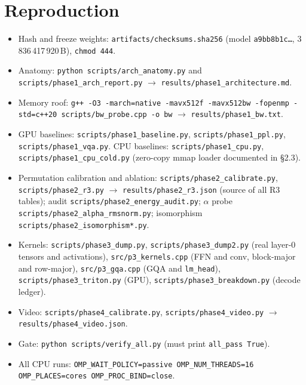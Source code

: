 \documentclass[11pt]{article}
\newcommand{\code}[1]{\texttt{\small #1}}
\begin{document}
\section{Reproduction}
\begin{sloppypar}
\begin{itemize}\raggedright
\item Hash and freeze weights: \code{artifacts/checksums.sha256} (model
\code{a9bb8b1c\ldots}, 3\,836\,417\,920\,B), \code{chmod 444}.
\item Anatomy: \code{python scripts/arch\_anatomy.py} and \code{scripts/phase1\_arch\_report.py}
$\rightarrow$ \code{results/phase1\_architecture.md}.
\item Memory roof: \code{g++ -O3 -march=native -mavx512f -mavx512bw -fopenmp -std=c++20
scripts/bw\_probe.cpp -o bw} $\rightarrow$ \code{results/phase1\_bw.txt}.
\item GPU baselines: \code{scripts/phase1\_baseline.py}, \code{scripts/phase1\_ppl.py},
\code{scripts/phase1\_vqa.py}. CPU baselines: \code{scripts/phase1\_cpu.py},
\code{scripts/phase1\_cpu\_cold.py} (zero-copy mmap loader documented in \S2.3).
\item Permutation calibration and ablation: \code{scripts/phase2\_calibrate.py},
\code{scripts/phase2\_r3.py} $\rightarrow$ \code{results/phase2\_r3.json} (source of all
R3 tables); audit \code{scripts/phase2\_energy\_audit.py}; $\alpha$ probe
\code{scripts/phase2\_alpha\_rmsnorm.py}; isomorphism \code{scripts/phase2\_isomorphism*.py}.
\item Kernels: \code{scripts/phase3\_dump.py}, \code{scripts/phase3\_dump2.py} (real
layer-0 tensors and activations), \code{src/p3\_kernels.cpp} (FFN and conv, block-major
and row-major), \code{src/p3\_gqa.cpp} (GQA and \code{lm\_head}), \code{scripts/phase3\_triton.py}
(GPU), \code{scripts/phase3\_breakdown.py} (decode ledger).
\item Video: \code{scripts/phase4\_calibrate.py}, \code{scripts/phase4\_video.py}
$\rightarrow$ \code{results/phase4\_video.json}.
\item Gate: \code{python scripts/verify\_all.py} (must print \code{all\_pass True}).
\item All CPU runs: \code{OMP\_WAIT\_POLICY=passive OMP\_NUM\_THREADS=16
OMP\_PLACES=cores OMP\_PROC\_BIND=close}.
\end{itemize}
\end{sloppypar}
\end{document}
